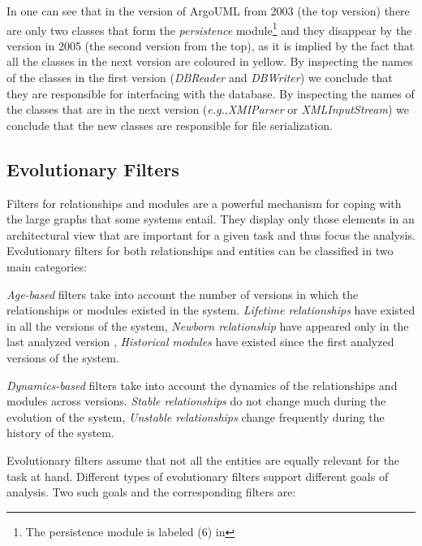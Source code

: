 \documentclass[preprint,12pt]{elsarticle}
\newcommand{\cd}[1]{{\em{#1}}}
\newcommand{\eg}{\emph{e.g.},\xspace}
\begin{document}
In  one can see that in the version of ArgoUML from 2003 (the top version) there are only two classes that form the \cd{persistence} module\footnote{The persistence module is labeled (6) in } and they disappear by the version in 2005 (the second version from the top), as it is implied by the fact that all the classes in the next version are coloured in yellow. By inspecting the names of the classes in the first version (\cd{DBReader} and \cd{DBWriter}) we conclude that they are responsible for interfacing with the database. By inspecting the names of the classes that are in the next version (\eg \cd{XMIParser} or \cd{XMLInputStream}) we conclude that the new classes are responsible for file serialization. 

\subsection {Evolutionary Filters}

Filters for relationships and modules are a powerful mechanism for coping with the large graphs that some systems entail. They display only those elements in an architectural view that are important for a given task and thus focus the analysis. Evolutionary filters for both relationships and entities can be classified in two main categories:

\begin{description}
\item {\em Age-based} filters take into account the number of versions in which the relationships or modules existed in the system. {\em Lifetime relationships} have existed in all the versions of the system, {\em Newborn relationship} have appeared only in the last analyzed version \cite{lungu-relevo}, {\em Historical modules} have existed since the first analyzed versions of the system.
\item {\em Dynamics-based} filters take into account the dynamics of the relationships and modules across versions. {\em Stable relationships} do not change much during the evolution of the system, {\em Unstable relationships} change frequently during the history of the system.
\end{description}

Evolutionary filters assume that not all the entities are equally relevant for the task at hand. Different types of evolutionary filters support different goals of analysis. Two such goals and the corresponding filters are:
\end{document}
